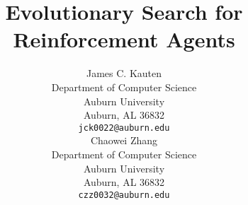 \title{Evolutionary Search for Reinforcement Agents}

\author{
	James C. Kauten \\
	Department of Computer Science \\
	Auburn University \\
	Auburn, AL 36832 \\
	\texttt{jck0022@auburn.edu} \\
	\And
	Chaowei Zhang \\
	Department of Computer Science \\
	Auburn University \\
	Auburn, AL 36832 \\
	\texttt{czz0032@auburn.edu} \\
}

\maketitle
\clearpage
